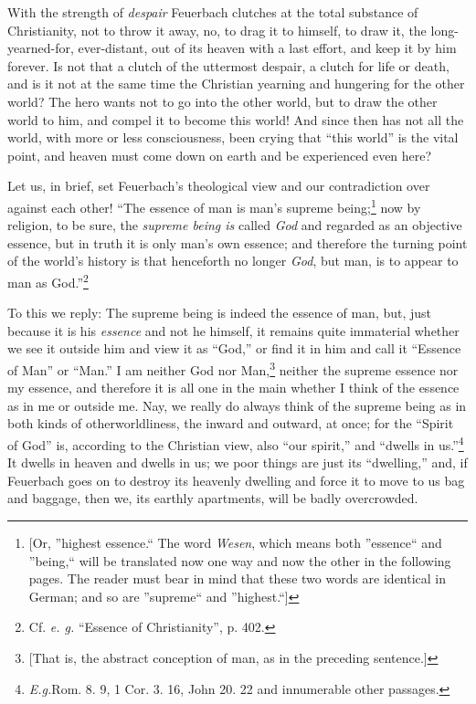\documentclass[12pt,a4paper]{book}
\begin{document}
With the strength of \textit{despair} Feuerbach clutches at the total 
substance of Christianity, not to throw it away, no, to drag it to himself, to 
draw it, the long-yearned-for, ever-distant, out of its heaven with a last 
effort, and keep it by him forever. Is not that a clutch of the uttermost 
despair, a clutch for life or death, and is it not at the same time the 
Christian yearning and hungering for the other world? The hero wants not to go 
into the other world, but to draw the other world to him, and compel it to 
become this world! And since then has not all the world, with more or less 
consciousness, been crying that ``this world'' is the vital point, and 
heaven must come down on earth and be experienced even here?

Let us, in brief, set Feuerbach's theological view and our contradiction over 
against each other! ``The essence of man is man's supreme 
being;\footnote{[Or, ''highest essence.`` The word \textit{Wesen}, which 
means both ''essence`` and ''being,`` will be translated now one way and 
now the other in the following pages. The reader must bear in mind that these 
two words are identical in German; and so are ''supreme`` and 
''highest.``]} now by religion, to be sure, the \textit{supreme being is} 
called \textit{God} and regarded as an objective essence, but in truth it is 
only man's own essence; and therefore the turning point of the world's history 
is that henceforth no longer \textit{God}, but man, is to appear to man as 
God.''\footnote{Cf. \textit{e. g.} ``Essence of Christianity'', p. 402.}

To this we reply: The supreme being is indeed the essence of man, but, just 
because it is his \textit{essence} and not he himself, it remains quite 
immaterial whether we see it outside him and view it as ``God,'' or find it 
in him and call it ``Essence of Man'' or ``Man.'' I am neither God nor 
Man,\footnote{[That is, the abstract conception of man, as in the preceding 
sentence.]} neither the supreme essence nor my essence, and therefore it is 
all one in the main whether I think of the essence as in me or outside me. 
Nay, we really do always think of the supreme being as in both kinds of 
otherworldliness, the inward and outward, at once; for the ``Spirit of God'' 
is, according to the Christian view, also ``our spirit,'' and ``dwells in 
us.''\footnote{\textit{E.g.}Rom. 8. 9, 1 Cor. 3. 16, John 20. 22 and 
innumerable other passages.} It dwells in heaven and dwells in us; we poor 
things are just its ``dwelling,'' and, if Feuerbach goes on to destroy its 
heavenly dwelling and force it to move to us bag and baggage, then we, its 
earthly apartments, will be badly overcrowded.
\end{document}
